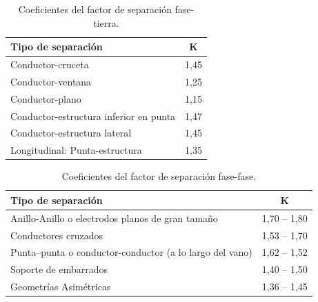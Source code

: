             \begin{table}[H]
                \centering
                \begin{tabular}{|l|c|}
                    \hline
                    \textbf{Tipo de separación}                           & \textbf{K}  \\ \hline
                    Conductor-cruceta                                     & 1,45        \\ \hline
                    Conductor-ventana                                     & 1,25        \\ \hline
                    Conductor-plano                                       & 1,15        \\ \hline
                    Conductor-estructura inferior en punta                & 1,47        \\ \hline
                    Conductor-estructura lateral                          & 1,45        \\ \hline
                    Longitudinal: Punta-estructura                        & 1,35        \\ \hline
                    \end{tabular}
                \caption{Coeficientes del factor de separación fase-tierra.}
                \label{tab:coefsFT}
            \end{table}

            \begin{table}[H]
                \centering
                \begin{tabular}{|l|c|}
                    \hline
                    \textbf{Tipo de separación}                                                   & \textbf{K}         \\ \hline
                    Anillo-Anillo o electrodos planos de gran tamaño                              & 1,70 -- 1,80       \\ \hline
                    Conductores cruzados                                                          & 1,53 -- 1,70       \\ \hline
                    Punta–punta o conductor-conductor (a lo largo del vano)                       & 1,62 -- 1,52       \\ \hline
                    Soporte de embarrados                                                         & 1,40 -- 1,50       \\ \hline
                    Geometrías Asimétricas                                                        & 1,36 -- 1,45       \\ \hline
                    \end{tabular}
                \caption{Coeficientes del factor de separación fase-fase.}
                \label{tab:coefsFF}
            \end{table}
            
